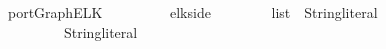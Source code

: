 \isamarkupfalse%
\ portGraphELK\ {\isacharequal}\isanewline
\ \ \ \ \ {\isacharcolon}{\isacharcolon}\ {\isachardoublequoteopen}\ {\isasymRightarrow}\ elk{\isacharunderscore}side{\isachardoublequoteclose}\isanewline
\ \ \ \ \ \ {\isacharcolon}{\isacharcolon}\ {\isachardoublequoteopen}\ list\ {\isasymRightarrow}\ String{\isachardot}literal{\isachardoublequoteclose}\isanewline
\ \ \ \ \ \ {\isacharcolon}{\isacharcolon}\ {\isachardoublequoteopen}\ {\isasymRightarrow}\ String{\isachardot}literal{\isachardoublequoteclose}
